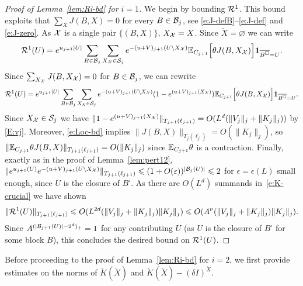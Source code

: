 \documentclass[11pt]{amsart}
\numberwithin{equation}{section}
\numberwithin{theorem}{section}
\newcommand{\1}{{\bf 1}}
\begin{document}
\begin{proof}[Proof of Lemma~\ref{lem:Ri-bd} for $i=1$]
We begin by bounding $\mathcal R^1$.   This bound exploits that $\sum_{X} J(B,X)=0$ for every $B\in\mathcal B_j$,
  see \eqref{e:J-defB}--\eqref{e:J-def} and \eqref{e:J-zero}.
  As $\mathcal X$ is a single pair $\{ (B,X)\}$, $X_{\mathcal X}=X$. Since
  $\check{X}=\varnothing$  we can write  
  \begin{equation}
    \cR^1(U) = e^{u_{j+1}|U|}\sum_{B\in \cB_j}\sum_{X_\cX \in \cS_j}e^{-(u+V)_{j+1}(U\setminus X_{\cX})} \E_{C_{j+1}}\qB{\theta J(B,X_\cX)} \1_{\overline{B^\square}=U }  .
  \end{equation}
  Since $\sum_{X_{\mathcal X}} J(B,X_{\mathcal X})=0$ for $B\in\mathcal B_j$, we can
  rewrite
\begin{equation} \label{e:K-crucial}
  \cR^1(U) = e^{u_{j+1}|U|}
  \sum_{B\in \cB_j}\sum_{X_\cX \in \cS_j}
  e^{-(u+V)_{j+1}(U\setminus  X_{\cX})}
  (1-e^{(u+V)_{j+1}(X_{\cX})}) \E_{C_{j+1}}\qB{\theta J(B,X_\cX)} \1_{\overline{B^\square}=U }.
\end{equation}
Since $X_{\mathcal X} \in \mathcal S_j$ we have
$\|1-e^{(u+V)_{j+1}(X_{\mathcal X})}\|_{T_{j+1}(\ell_{j+1})} =
O(L^d(\|V_j\|_j+\|K_j\|_j))$ by \eqref{E:vj}.  Moreover,
\eqref{e:Loc-bd} implies
$\|J(B, X)\|_{T_{j}(\ell_{j})} =O(\|K_j\|_{j})$, so
$\|\mathbb{E}_{C_{j+1}}\theta J(B, X)\|_{T_{j+1}(\ell_{j+1})} =O(\|K_j\|_{j})$
since $\mathbb{E}_{C_{j+1}}\theta$ is a contraction.  Finally, exactly as in
the proof of Lemma~\ref{lem:pert12},
$\|e^{u_{j+1}(U)}e^{-(u+V)_{j+1}(U\setminus
  X_{\mathcal X})}\|_{T_{j+1}(\ell_{j+1})}\leqslant
(1+O(\varepsilon))^{|\mathcal B_j(U)|}\leqslant 2$ for $\epsilon=\epsilon(L)$
  small enough, since $U$ is the closure of $B^\square$.  As there
are $O(L^{d})$ summands in~\eqref{e:K-crucial} we have shown
\begin{equation}
  \|\mathcal R^1(U)\|_{T_{j+1}(\ell_{j+1})} \leqslant O(L^{2d}(\|V_j\|_j+\|K_j\|_j)\|K_j\|_j)
  \leqslant O(A^{\nu}(\|V_j\|_j+\|K_j\|_j)\|K_j\|_j).
\end{equation}
Since $A^{(|\mathcal B_{j+1}(U)|-2^{d})_{+}}=1$ for any contributing $U$
(as $U$ is the closure of $B^{\square}$ for some block $B$), this concludes the
desired bound on $\mathcal R^{1}(U)$.
\end{proof}


Before proceeding to the proof of Lemma~\ref{lem:Ri-bd} for $i=2$,
we first provide estimates on the norms of
$\check{K}(\check{X})$ and $\check{K}(\check{X})-(\delta I)^{\check{X}}$.
\end{document}
